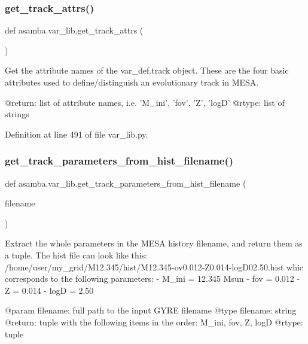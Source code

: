 \subsubsection{\texorpdfstring{get\+\_\+track\+\_\+attrs()}{get\_track\_attrs()}}
{\footnotesize\ttfamily def asamba.\+var\+\_\+lib.\+get\+\_\+track\+\_\+attrs (\begin{DoxyParamCaption}{ }\end{DoxyParamCaption})}

\begin{DoxyVerb}Get the attribute names of the var_def.track object. These are the four basic attributes used to 
define/distinguish an evolutionary track in MESA.

@return: list of attribute names, i.e. 'M_ini', 'fov', 'Z', 'logD'
@rtype: list of strings
\end{DoxyVerb}
 

Definition at line 491 of file var\+\_\+lib.\+py.

\mbox{\label{namespaceasamba_1_1var__lib_a0aceded8224b425f6576bad342e05069}} 
\subsubsection{\texorpdfstring{get\+\_\+track\+\_\+parameters\+\_\+from\+\_\+hist\+\_\+filename()}{get\_track\_parameters\_from\_hist\_filename()}}
{\footnotesize\ttfamily def asamba.\+var\+\_\+lib.\+get\+\_\+track\+\_\+parameters\+\_\+from\+\_\+hist\+\_\+filename (\begin{DoxyParamCaption}\item[{}]{filename }\end{DoxyParamCaption})}

\begin{DoxyVerb}Extract the whole parameters in the MESA history filename, and return them as a tuple. The hist 
file can look like this:
/home/user/my_grid/M12.345/hist/M12.345-ov0.012-Z0.014-logD02.50.hist
whic corresponds to the following parameters:
- M_ini    = 12.345 Msun
- fov      = 0.012
- Z        = 0.014
- logD     = 2.50

@param filename: full path to the input GYRE filename
@type filename: string
@return: tuple with the following items in the order: M_ini, fov, Z, logD
@rtype: tuple
\end{DoxyVerb}
 

